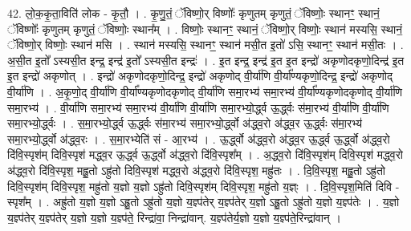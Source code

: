 \documentclass[17pt]{extarticle}
\begin{document}
42. लो॒क॒कृ॒ता॒विति॑ लोक - कृ॒तौ॒ । . कृ॒णु॒तं॒ ॅविष्णो॒र् विष्णोः᳚ कृणुतम् कृणुतं॒ ॅविष्णोः॒ स्थानꣳ॒॒ स्थानं॒ ॅविष्णोः᳚ कृणुतम् कृणुतं॒ ॅविष्णोः॒ स्थान᳚म् । . विष्णोः॒ स्थानꣳ॒॒ स्थानं॒ ॅविष्णो॒र् विष्णोः॒ स्थान॑ मस्यसि॒ स्थानं॒ ॅविष्णो॒र् विष्णोः॒ स्थान॑ मसि । . स्थान॑ मस्यसि॒ स्थानꣳ॒॒ स्थान॑ मसी॒त इ॒तो॑ ऽसि॒ स्थानꣳ॒॒ स्थान॑ मसी॒तः । . अ॒सी॒त इ॒तो᳚ ऽस्यसी॒त इन्द्र॒ इन्द्र॑ इ॒तो᳚ ऽस्यसी॒त इन्द्रः॑ । . इ॒त इन्द्र॒ इन्द्र॑ इ॒त इ॒त इन्द्रो॑ अकृणोदकृणो॒दिन्द्र॑ इ॒त इ॒त इन्द्रो॑ अकृणोत् । . इन्द्रो॑ अकृणोदकृणो॒दिन्द्र॒ इन्द्रो॑ अकृणोद् वी॒र्या॑णि वी॒र्या᳚ण्यकृणो॒दिन्द्र॒ इन्द्रो॑ अकृणोद् वी॒र्या॑णि । . अ॒कृ॒णो॒द् वी॒र्या॑णि वी॒र्या᳚ण्यकृणोदकृणोद् वी॒र्या॑णि समा॒रभ्य॑ समा॒रभ्य॑ वी॒र्या᳚ण्यकृणोदकृणोद् वी॒र्या॑णि समा॒रभ्य॑ । . वी॒र्या॑णि समा॒रभ्य॑ समा॒रभ्य॑ वी॒र्या॑णि वी॒र्या॑णि समा॒रभ्यो॒र्द्ध्व ऊ॒र्द्ध्वः स॑मा॒रभ्य॑ वी॒र्या॑णि वी॒र्या॑णि समा॒रभ्यो॒र्द्ध्वः । . स॒मा॒रभ्यो॒र्द्ध्व ऊ॒र्द्ध्वः स॑मा॒रभ्य॑ समा॒रभ्यो॒र्द्ध्वो अ॑द्ध्व॒रो अ॑द्ध्व॒र ऊ॒र्द्ध्वः स॑मा॒रभ्य॑ समा॒रभ्यो॒र्द्ध्वो अ॑द्ध्व॒रः । . स॒मा॒रभ्येति॑ सं - आ॒रभ्य॑ । . ऊ॒र्द्ध्वो अ॑द्ध्व॒रो अ॑द्ध्व॒र ऊ॒र्द्ध्व ऊ॒र्द्ध्वो अ॑द्ध्व॒रो दि॑वि॒स्पृश॑म् दिवि॒स्पृश॑ मद्ध्व॒र ऊ॒र्द्ध्व ऊ॒र्द्ध्वो अ॑द्ध्व॒रो दि॑वि॒स्पृश᳚म् । . अ॒द्ध्व॒रो दि॑वि॒स्पृश॑म् दिवि॒स्पृश॑ मद्ध्व॒रो अ॑द्ध्व॒रो दि॑वि॒स्पृश॒ मह्रु॒तो ऽह्रु॑तो दिवि॒स्पृश॑ मद्ध्व॒रो अ॑द्ध्व॒रो दि॑वि॒स्पृश॒ मह्रु॑तः । . दि॒वि॒स्पृश॒ मह्रु॒तो ऽह्रु॑तो दिवि॒स्पृश॑म् दिवि॒स्पृश॒ मह्रु॑तो य॒ज्ञो य॒ज्ञो ऽह्रु॑तो दिवि॒स्पृश॑म् दिवि॒स्पृश॒ मह्रु॑तो य॒ज्ञ्ः । . दि॒वि॒स्पृश॒मिति॑ दिवि - स्पृश᳚म् । . अह्रु॑तो य॒ज्ञो य॒ज्ञो ऽह्रु॒तो ऽह्रु॑तो य॒ज्ञो य॒ज्ञ्प॑तेर् य॒ज्ञ्प॑तेर् य॒ज्ञो ऽह्रु॒तो ऽह्रु॑तो य॒ज्ञो य॒ज्ञ्प॑तेः । . य॒ज्ञो य॒ज्ञ्प॑तेर् य॒ज्ञ्प॑तेर् य॒ज्ञो य॒ज्ञो य॒ज्ञ्प॑ते॒ रिन्द्रा॑वा॒ निन्द्रा॑वान्. य॒ज्ञ्प॑तेर्य॒ज्ञो य॒ज्ञो य॒ज्ञ्प॑ते॒रिन्द्रा॑वान् । \newline
\end{document}
